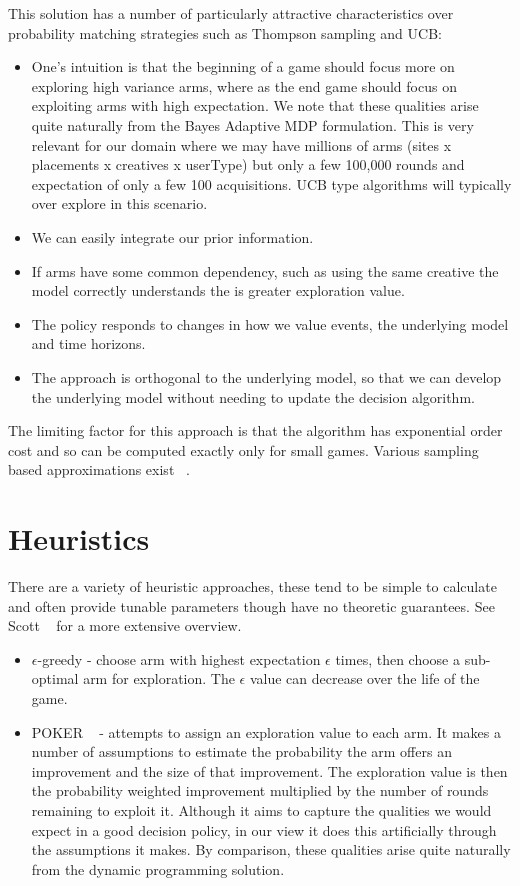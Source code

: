 \documentclass[11pt,a4,singlespacing,titlepagenumber=on]{scrreprt}
\numberwithin{equation}{chapter} %
\theoremstyle{remark}
\begin{document}
This solution has a number of particularly attractive characteristics over probability matching strategies such as Thompson sampling and UCB:
\begin{itemize}
	\item One's intuition is that the beginning of a game should focus more on exploring high variance arms, where as the end game should focus on exploiting arms with high expectation. We note that these qualities arise quite naturally from the Bayes Adaptive MDP formulation. This is very relevant for our domain where we may have millions of arms (sites x placements x creatives x userType) but only a few 100,000 rounds and expectation of only a few 100 acquisitions. UCB type algorithms will typically over explore in this scenario.
	\item We can easily integrate our prior information.
	\item If arms have some common dependency, such as using the same creative the model correctly understands the is greater exploration value.
	\item The policy responds to changes in how we value events, the underlying model and time horizons.
	\item The approach is orthogonal to the underlying model, so that we can develop the underlying model without needing to update the decision algorithm.
\end{itemize}

The limiting factor for this approach is that the algorithm has exponential order cost and so can be computed exactly only for small games. Various sampling based approximations exist ~\cite{guez2012efficient}.

\section{ Heuristics } \label{sec:heuristics}

There are a variety of heuristic approaches, these tend to be simple to calculate and often provide tunable parameters though have no theoretic guarantees. See Scott ~\cite{scott2010modern} for a more extensive overview.

\begin{itemize}
	\item $\epsilon$-greedy - choose arm with highest expectation $\epsilon$ times, then choose a sub-optimal arm for exploration. The $\epsilon$ value can decrease over the life of the game.
	\item POKER ~\cite{vermorel2005multi} - attempts to assign an exploration value to each arm. It makes a number of assumptions to estimate the probability the arm offers an improvement and the size of that improvement. The exploration value is then the probability weighted improvement multiplied by the number of rounds remaining to exploit it. Although it aims to capture the qualities we would expect in a good decision policy, in our view it does this artificially through the assumptions it makes. By comparison, these qualities arise quite naturally from the dynamic programming solution.
\end{itemize}
\end{document}
